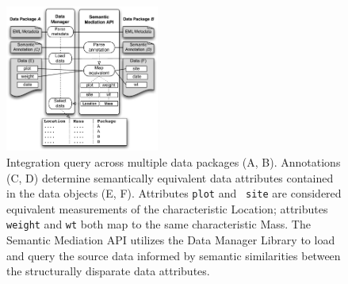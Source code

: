 \begin{figure}
\centering
\includegraphics[width=0.45\textwidth]{images/integration.pdf}
\caption{Integration query across multiple data packages (A, B).
  Annotations (C, D) determine semantically equivalent data attributes
  contained in the data objects (E, F). Attributes {\tt plot} and {\tt
    site} are considered equivalent measurements of the characteristic
  Location; attributes {\tt weight} and {\tt wt} both map to the same
  characteristic Mass. The Semantic Mediation API utilizes the Data
  Manager Library to load and query the source data informed by
  semantic similarities between the structurally disparate data
  attributes.}
\label{fig:integration}
\end{figure}

